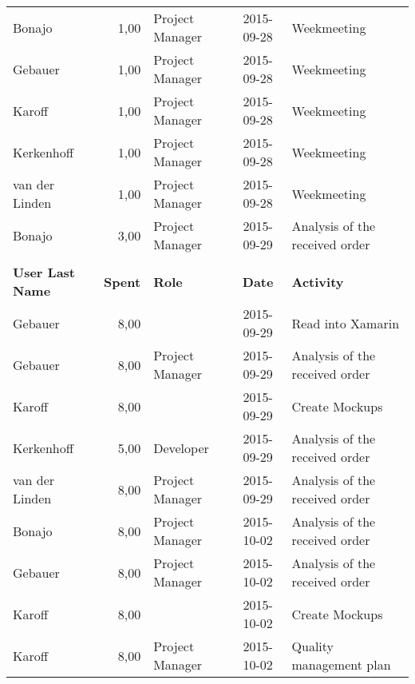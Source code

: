 \begin{longtable}{ l r p{2cm} c p{4cm}}
		Bonajo                  & 1,00           & Project Manager & 2015-09-28    & Weekmeeting                                     \\
		Gebauer                 & 1,00           & Project Manager & 2015-09-28    & Weekmeeting                                     \\
		Karoff                  & 1,00           & Project Manager & 2015-09-28    & Weekmeeting                                     \\
		Kerkenhoff              & 1,00           & Project Manager & 2015-09-28    & Weekmeeting                                     \\
		van der Linden          & 1,00           & Project Manager & 2015-09-28    & Weekmeeting                                     \\
		Bonajo                  & 3,00           & Project Manager & 2015-09-29    & Analysis of the received order                  \\\\
		\textbf{User Last Name} & \textbf{Spent} & \textbf{Role} & \textbf{Date} & \textbf{Activity} \\
		\hline
		Gebauer                 & 8,00           &                 & 2015-09-29    & Read into Xamarin                               \\
		Gebauer                 & 8,00           & Project Manager & 2015-09-29    & Analysis of the received order                  \\
		Karoff                  & 8,00           &                 & 2015-09-29    & Create Mockups                                  \\
		Kerkenhoff              & 5,00           & Developer       & 2015-09-29    & Analysis of the received order                  \\
		van der Linden          & 8,00           & Project Manager & 2015-09-29    & Analysis of the received order                  \\
		Bonajo                  & 8,00           & Project Manager & 2015-10-02    & Analysis of the received order                  \\
		Gebauer                 & 8,00           & Project Manager & 2015-10-02    & Analysis of the received order                  \\
		Karoff                  & 8,00           &                 & 2015-10-02    & Create Mockups                                  \\
		Karoff                  & 8,00           & Project Manager & 2015-10-02    & Quality management plan                         \\

\end{longtable}
